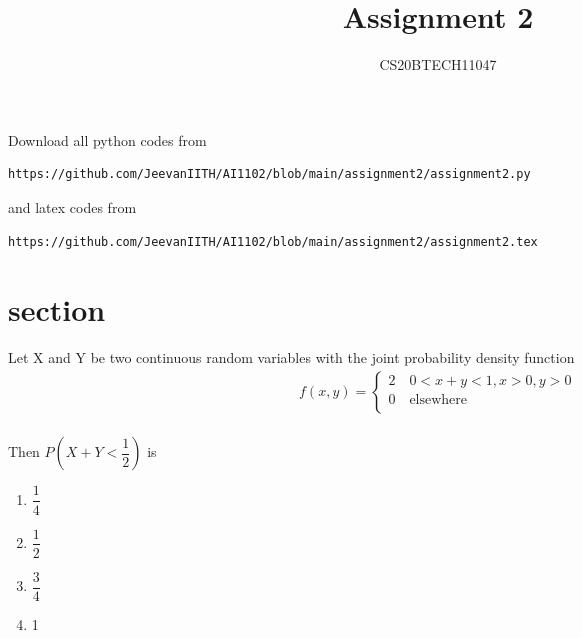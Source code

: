 \documentclass[journal,12pt,twocolumn]{IEEEtran}
\begin{document}
\let\vec\mathbf
\renewcommand{\thefigure}{\theproblem}
\def\putbox#1#2#3{\makebox[0in][l]{\makebox[#1][l]{}\raisebox{\baselineskip}[0in][0in]{\raisebox{#2}[0in][0in]{#3}}}}
     \def\rightbox#1{\makebox[0in][r]{#1}}
     \def\centbox#1{\makebox[0in]{#1}}
     \def\topbox#1{\raisebox{-\baselineskip}[0in][0in]{#1}}
     \def\midbox#1{\raisebox{-0.5\baselineskip}[0in][0in]{#1}}
\vspace{3cm}
\title{Assignment 2}
\author{CS20BTECH11047}
\maketitle
\newpage
\bigskip
\renewcommand{\thefigure}{\arabic{figure}}
\renewcommand{\thetable}{\arabic{table}}
Download all python codes from 
\begin{lstlisting}
https://github.com/JeevanIITH/AI1102/blob/main/assignment2/assignment2.py
\end{lstlisting}
%
and latex codes from 
%
\begin{lstlisting}
https://github.com/JeevanIITH/AI1102/blob/main/assignment2/assignment2.tex
\end{lstlisting}
\section*{section}
Let X and Y be two continuous random variables with the joint probability density function\\
\begin{align}
    f\left(x,y\right)=\begin{cases}
    2 \quad  0<x+y<1 ,x>0 ,y>0\\
    0 \quad  \textrm{elsewhere}\\
    \end{cases}
\end{align}
\\
Then $P\left(X+Y<\dfrac{1}{2}\right)$ is\\
  \begin{multicols}{2}
   \begin{enumerate}
   
     \item $\dfrac{1}{4}$\\
     \item $\dfrac{1}{2}$\\
     \item $\dfrac{3}{4}$\\
     \item  1\\
   \end{enumerate}
   \end{multicols}
\end{document}
